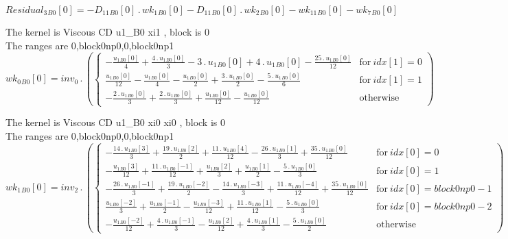 \documentclass{article}
\begin{document}
\begin{dmath}{Residual_{3}{_{B0}}}[{0}] = - {D_{11}{_{B0}}}[{0}] \,.\, {wk_{1}{_{B0}}}[{0}] - {D_{11}{_{B0}}}[{0}] \,.\, {wk_{2}{_{B0}}}[{0}] - {wk_{11}{_{B0}}}[{0}] - {wk_{7}{_{B0}}}[{0}]\end{dmath}

\noindent The kernel is Viscous CD u1_B0 xi1 , block is 0\\\noindent The ranges are 0,block0np0,0,block0np1\\\begin{dmath}{wk_{0}{_{B0}}}[{0}] = inv_0 \,.\, \left(\begin{cases} - \frac{{u_{1}{_{B0}}}[{0}]}{4} + \frac{4 \,.\, {u_{1}{_{B0}}}[{0}]}{3} - 3 \,.\, {u_{1}{_{B0}}}[{0}] + 4 \,.\, {u_{1}{_{B0}}}[{0}] - \frac{25 \,.\, {u_{1}{_{B0}}}[{0}]}{12} & 
\text{for}\: {idx}[{1}] = 0 \\\frac{{u_{1}{_{B0}}}[{0}]}{12} - \frac{{u_{1}{_{B0}}}[{0}]}{4} - \frac{{u_{1}{_{B0}}}[{0}]}{2} + \frac{3 \,.\, {u_{1}{_{B0}}}[{0}]}{2} - \frac{5 \,.\, {u_{1}{_{B0}}}[{0}]}{6} & \text{for}\: {idx}[{1}] = 1 \\- \frac{2 
\,.\, {u_{1}{_{B0}}}[{0}]}{3} + \frac{2 \,.\, {u_{1}{_{B0}}}[{0}]}{3} + \frac{{u_{1}{_{B0}}}[{0}]}{12} - \frac{{u_{1}{_{B0}}}[{0}]}{12} & \text{otherwise} \end{cases}\right)\end{dmath}

\noindent The kernel is Viscous CD u1_B0 xi0 xi0 , block is 0\\\noindent The ranges are 0,block0np0,0,block0np1\\\begin{dmath}{wk_{1}{_{B0}}}[{0}] = inv_2 \,.\, \left(\begin{cases} - \frac{14 \,.\, {u_{1}{_{B0}}}[{3}]}{3} + \frac{19 \,.\, {u_{1}{_{B0}}}[{2}]}{2} + \frac{11 \,.\, {u_{1}{_{B0}}}[{4}]}{12} - \frac{26 \,.\, {u_{1}{_{B0}}}[{1}]}{3} + \frac{35 \,.\, 
{u_{1}{_{B0}}}[{0}]}{12} & \text{for}\: {idx}[{0}] = 0 \\- \frac{{u_{1}{_{B0}}}[{3}]}{12} + \frac{11 \,.\, {u_{1}{_{B0}}}[{-1}]}{12} + \frac{{u_{1}{_{B0}}}[{2}]}{3} + \frac{{u_{1}{_{B0}}}[{1}]}{2} - \frac{5 \,.\, {u_{1}{_{B0}}}[{0}]}{3} & 
\text{for}\: {idx}[{0}] = 1 \\- \frac{26 \,.\, {u_{1}{_{B0}}}[{-1}]}{3} + \frac{19 \,.\, {u_{1}{_{B0}}}[{-2}]}{2} - \frac{14 \,.\, {u_{1}{_{B0}}}[{-3}]}{3} + \frac{11 \,.\, {u_{1}{_{B0}}}[{-4}]}{12} + \frac{35 \,.\, {u_{1}{_{B0}}}[{0}]}{12} & 
\text{for}\: {idx}[{0}] = block0np0 - 1 \\\frac{{u_{1}{_{B0}}}[{-2}]}{3} + \frac{{u_{1}{_{B0}}}[{-1}]}{2} - \frac{{u_{1}{_{B0}}}[{-3}]}{12} + \frac{11 \,.\, {u_{1}{_{B0}}}[{1}]}{12} - \frac{5 \,.\, {u_{1}{_{B0}}}[{0}]}{3} & \text{for}\: {idx}[{0}] = 
block0np0 - 2 \\- \frac{{u_{1}{_{B0}}}[{-2}]}{12} + \frac{4 \,.\, {u_{1}{_{B0}}}[{-1}]}{3} - \frac{{u_{1}{_{B0}}}[{2}]}{12} + \frac{4 \,.\, {u_{1}{_{B0}}}[{1}]}{3} - \frac{5 \,.\, {u_{1}{_{B0}}}[{0}]}{2} & \text{otherwise} 
\end{cases}\right)\end{dmath}
\end{document}
